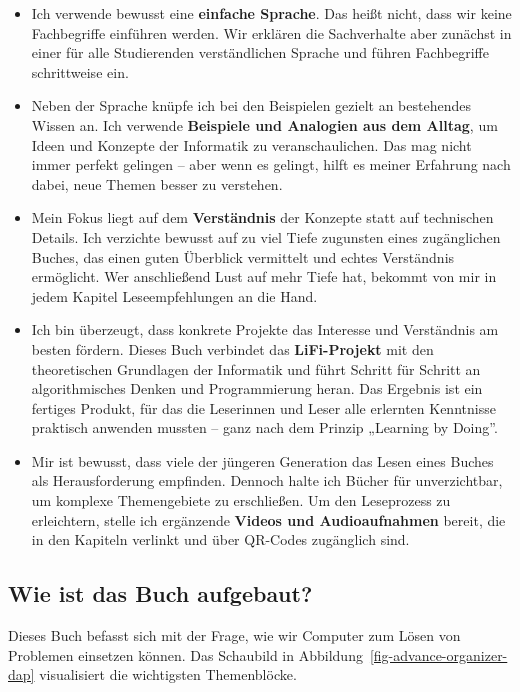 \documentclass[
  letterpaper,
  DIV=11]{scrartcl}
\begin{document}
\begin{itemize}
\item
  Ich verwende bewusst eine \textbf{einfache Sprache}. Das heißt nicht,
  dass wir keine Fachbegriffe einführen werden. Wir erklären die
  Sachverhalte aber zunächst in einer für alle Studierenden
  verständlichen Sprache und führen Fachbegriffe schrittweise ein.
\item
  Neben der Sprache knüpfe ich bei den Beispielen gezielt an bestehendes
  Wissen an. Ich verwende \textbf{Beispiele und Analogien aus dem
  Alltag}, um Ideen und Konzepte der Informatik zu veranschaulichen. Das
  mag nicht immer perfekt gelingen -- aber wenn es gelingt, hilft es
  meiner Erfahrung nach dabei, neue Themen besser zu verstehen.
\item
  Mein Fokus liegt auf dem \textbf{Verständnis} der Konzepte statt auf
  technischen Details. Ich verzichte bewusst auf zu viel Tiefe zugunsten
  eines zugänglichen Buches, das einen guten Überblick vermittelt und
  echtes Verständnis ermöglicht. Wer anschließend Lust auf mehr Tiefe
  hat, bekommt von mir in jedem Kapitel Leseempfehlungen an die Hand.
\item
  Ich bin überzeugt, dass konkrete Projekte das Interesse und
  Verständnis am besten fördern. Dieses Buch verbindet das
  \textbf{LiFi-Projekt} mit den theoretischen Grundlagen der Informatik
  und führt Schritt für Schritt an algorithmisches Denken und
  Programmierung heran. Das Ergebnis ist ein fertiges Produkt, für das
  die Leserinnen und Leser alle erlernten Kenntnisse praktisch anwenden
  mussten -- ganz nach dem Prinzip „Learning by Doing''.
\item
  Mir ist bewusst, dass viele der jüngeren Generation das Lesen eines
  Buches als Herausforderung empfinden. Dennoch halte ich Bücher für
  unverzichtbar, um komplexe Themengebiete zu erschließen. Um den
  Leseprozess zu erleichtern, stelle ich ergänzende \textbf{Videos und
  Audioaufnahmen} bereit, die in den Kapiteln verlinkt und über QR-Codes
  zugänglich sind.
\end{itemize}

\subsection{Wie ist das Buch
aufgebaut?}\label{wie-ist-das-buch-aufgebaut}

Dieses Buch befasst sich mit der Frage, wie wir Computer zum Lösen von
Problemen einsetzen können. Das Schaubild in
Abbildung~\ref{fig-advance-organizer-dap} visualisiert die wichtigsten
Themenblöcke.
\end{document}
